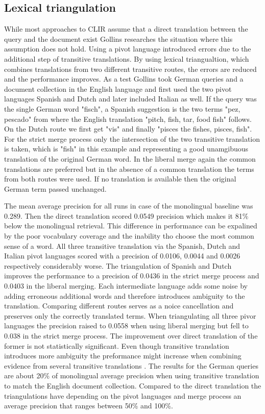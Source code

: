 \documentclass[journal]{IEEEtran}
\begin{document}
\subsection{Lexical triangulation}
While most approaches to CLIR assume that a direct translation between the query and the document exist Gollins \cite{gollins01} researches the situation where this assumption does not hold.
Using a pivot language introduced errors due to the additional step of transitive translations.
By using lexical triangualtion, which combines translations from two different transitive routes, the errors are reduced and the performance improves.
As a test Gollins took German queries and a document collection in the English language and first used the two pivot languages Spanish and Dutch and later included Italian as well.
If the query was the single German word "fisch", a Spanish suggestion is the two terms "pez, pescado" from where the English translation "pitch, fish, tar, food fish" follows.
On the Dutch route we first get "vis" and finally "pisces the fishes, pisces, fish".
For the strict merge process only the intersection of the two transitive translation is taken, which is "fish" in this example and representing a good unamgibuous translation of the original German word.
In the liberal merge again the common translations are preferred but in the absence of a common translation the terms from both routes were used.
If no translation is available then the original German term passed unchanged.

The mean average precision for all runs in case of the monolingual baseline was 0.289.
Then the direct translation scored 0.0549 precision which makes it 81\% below the monolingual retrieval.
This difference in performance can be expalined by the poor vocabulary coverage and the inability tho choose the most common sense of a word.
All three transitive translation via the Spanish, Dutch and Italian pivot languages scored with a precision of 0.0106, 0.0044 and 0.0026 respectively considerably worse.
The triangulation of Spanish and Dutch improves the performance to a precision of 0.0436 in the strict merge process and 0.0403 in the liberal merging.
Each intermediate language adds some noise by adding erroneous additional words and therefore introduces ambiguity to the translation.
Comparing different routes serves as a noice cancellation and preserves only the correctly translated terms.
When triangulating all three pivor languages the precision raised to 0.0558 when using liberal merging but fell to 0.038 in the strict merge process.
The improvement over direct translation of the former is not statistically significant.
Even though transitive translation introduces more ambiguity the preformance might increase when combining evidence from several transitive translations \cite{ballesteros00}.
The results for the German queries are about 20\% of monolingual average precision when using transitive translation to match the English document collection.
Compared to the direct translation the triangulations have depending on the pivot languages and merge process an average precision that ranges between 50\% and 100\%.
\end{document}
